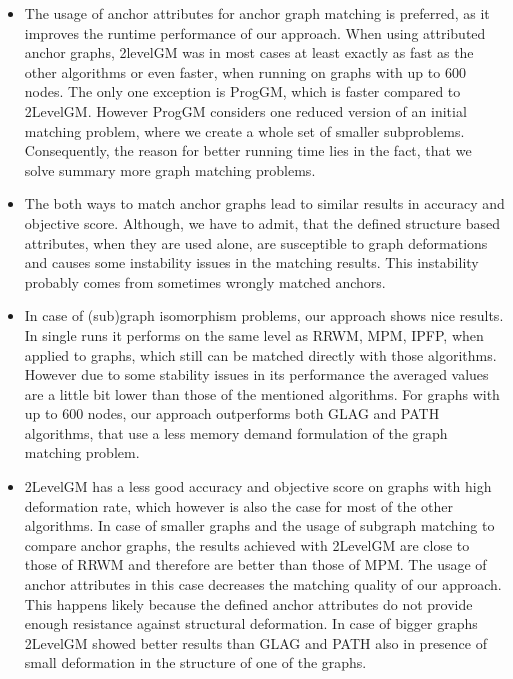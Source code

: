 \begin{itemize}
\item The usage of anchor attributes for anchor graph matching is preferred, as it improves the runtime performance of our approach. 
When using attributed anchor graphs, 2levelGM was in most cases at least exactly as fast as the other algorithms or even faster, when running on graphs with up to $600$ nodes. The only one exception is ProgGM, which is faster compared to 2LevelGM. However ProgGM considers one reduced version of an initial matching problem, where we create a whole set of smaller subproblems. Consequently, the reason for better running time lies in the fact, that we solve summary more graph matching problems.
\item The both ways to match anchor graphs lead to similar results in accuracy and objective score. Although, we have to admit, that the defined structure based attributes, when they are used alone, are susceptible to graph deformations and causes some instability issues in the matching results. This instability probably comes from sometimes wrongly matched anchors.
\item In case of (sub)graph isomorphism problems, our approach shows nice results. In single runs it performs on the same level as RRWM, MPM, IPFP, when applied to graphs, which still can be matched directly with those algorithms. However due to some stability issues in its performance the averaged values are a little bit lower than those of the mentioned algorithms. For graphs with up to $600$ nodes, our approach outperforms both GLAG and PATH algorithms, that use a less memory demand formulation of the graph matching problem.
\item 2LevelGM has a less good accuracy and objective score on graphs with high deformation rate, which however is also the case for most of the other algorithms. In case of smaller graphs and the usage of subgraph matching to compare anchor graphs, the results achieved with 2LevelGM are close to those of RRWM and therefore are better than those of MPM. The usage of anchor attributes in this case decreases the matching quality of our approach.  This happens likely because the defined anchor attributes do not provide enough resistance against structural deformation. In case of bigger graphs 2LevelGM showed better results than GLAG and PATH also in presence of small deformation in the structure of one of the graphs.

\end{itemize}
